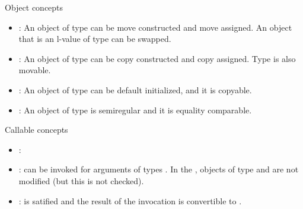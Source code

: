 \begin{frame}[t,fragile]{Object concepts}
\begin{itemize}
  \item {}:
  An object of type  can be move constructed and move assigned.
  An object that is an l-value of type  can be swapped.

  \item {}:
  An object of type  can be copy constructed and copy assigned.
  Type  is also movable.

  \item {}:
  An object of type  can be default initialized, and it is copyable.

  \item {}:
  An object of type  is semiregular and it is equality comparable.
\end{itemize}
\end{frame}

\begin{frame}[t,fragile]{Callable concepts}
\begin{itemize}
  \item {}:
  \item {}:
   can be invoked for arguments of types .
  In the , objects of type  and  are
  not modified (but this is not checked).

  \item {}:
   is satified and the result
  of the invocation is convertible to .   
\end{itemize}
\end{frame}

